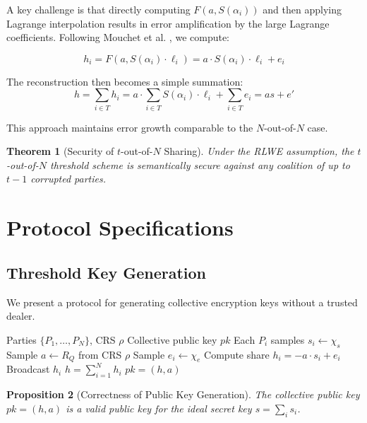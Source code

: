 \documentclass[11pt,a4paper]{article}
\newtheorem{theorem}{Theorem}[section]
\newtheorem{proposition}[theorem]{Proposition}
\begin{document}
A key challenge is that directly computing $F(a, S(\alpha_i))$ and then applying Lagrange interpolation results in error amplification by the large Lagrange coefficients. Following Mouchet et al. \cite{mouchet2022threshold}, we compute:

\begin{equation}
h_i = F(a, S(\alpha_i) \cdot \ell_i) = a \cdot S(\alpha_i) \cdot \ell_i + e_i
\end{equation}

The reconstruction then becomes a simple summation:
\begin{equation}
h = \sum_{i \in T} h_i = a \cdot \sum_{i \in T} S(\alpha_i) \cdot \ell_i + \sum_{i \in T} e_i = as + e'
\end{equation}

This approach maintains error growth comparable to the $N$-out-of-$N$ case.

\begin{theorem}[Security of $t$-out-of-$N$ Sharing]
Under the RLWE assumption, the $t$-out-of-$N$ threshold scheme is semantically secure against any coalition of up to $t-1$ corrupted parties.
\end{theorem}

\section{Protocol Specifications}

\subsection{Threshold Key Generation}

We present a protocol for generating collective encryption keys without a trusted dealer.

\begin{algorithm}
\caption{Collective Public Key Generation}
\begin{algorithmic}[1]
\Require Parties $\{P_1, \ldots, P_N\}$, CRS $\rho$
\Ensure Collective public key $pk$
\State Each $P_i$ samples $s_i \leftarrow \chi_s$
\State Sample $a \leftarrow R_Q$ from CRS $\rho$
    \State Sample $e_i \leftarrow \chi_e$
    \State Compute share $h_i = -a \cdot s_i + e_i$
    \State Broadcast $h_i$
\EndFor
\State $h = \sum_{i=1}^{N} h_i$
\State $pk = (h, a)$
\end{algorithmic}
\end{algorithm}

\begin{proposition}[Correctness of Public Key Generation]
The collective public key $pk = (h, a)$ is a valid public key for the ideal secret key $s = \sum_i s_i$.
\end{proposition}
\end{document}
